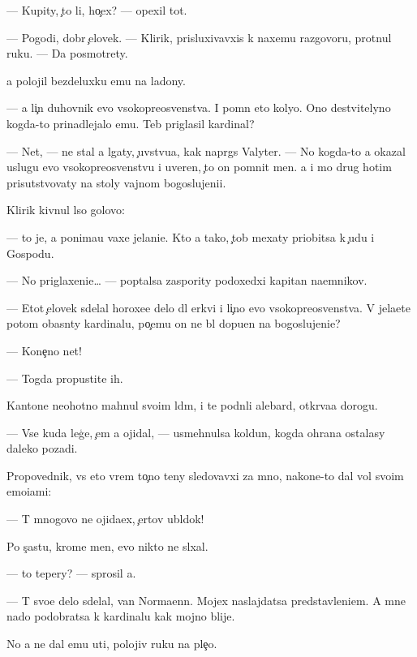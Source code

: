 \documentclass[10pt]{book}
\begin{document}
— Kupity, {\c}to li, ho{\c}ex? — opexil tot.

— Pogodi, dobr{\yi}{\y} {\c}elovek. — Klirik, prisluxivavxi{\y}s{\ia} k naxemu razgovoru, prot{\ia}nul ruku. — Da{\y} posmotrety.

{\Y}a polojil bezdeluxku {\y}emu na ladony.

— {\Y}a li{\c}n{\yi}{\y} duhovnik {\y}evo v{\yi}sokopreosv{\ia}{\x}enstva. I pomn{\iu} eto koly{\q}o. Ono de{\y}stvitelyno kogda-to prinadlejalo {\y}emu. Teb{\ia} priglasil kardinal?

— Net, — ne stal {\y}a lgaty, {\c}uvstvu{\y}a, kak napr{\ia}gs{\ia} Valyter. — No kogda-to {\y}a okazal uslugu {\y}evo v{\yi}sokopreosv{\ia}{\x}enstvu i uveren, {\c}to on pomnit men{\ia}. {\Y}a i mo{\y} drug hotim prisutstvovaty na stoly vajnom bogoslujeni{\y}i.

Klirik kivnul l{\yi}so{\y} golovo{\y}:

— {\C}to je, {\y}a ponima{\y}u vaxe jelani{\y}e. Kto {\y}a tako{\y}, {\c}tob{\yi} mexaty priob{\x}itsa k {\c}udu i Gospodu.

— No priglaxeni{\y}e… — pop{\yi}talsa zaspority podoxedxi{\y} kapitan na{\y}emnikov.

— Etot {\c}elovek sdelal horoxe{\y}e delo dl{\ia} {\Q}erkvi i li{\c}no {\y}evo v{\yi}sokopreosv{\ia}{\x}enstva. V{\yi} jela{\y}ete potom ob{\y}asn{\ia}ty kardinalu, po{\c}emu on ne b{\yi}l dopu{\x}en na bogoslujeni{\y}e?

— Kone{\c}no net!

— Togda propustite ih.

Kantone{\q} neohotno mahnul svo{\y}im l{\iu}d{\ia}m, i te podn{\ia}li alebard{\yi}, otkr{\yi}va{\y}a dorogu.

— Vse kuda leg{\c}e, {\c}em {\y}a ojidal, — usmehnulsa koldun, kogda ohrana ostalasy daleko pozadi.

Propovednik, vs{\e} eto vrem{\ia} to{\c}no teny sledovavxi{\y} za mno{\y}, nakone{\q}-to dal vol{\iu} svo{\y}im emo{\q}i{\y}ami:

— T{\yi} mnogovo ne ojida{\y}ex, {\c}ertov ubl{\iu}dok!

Po s{\c}ast{\y}u, krome men{\ia}, {\y}evo nikto ne sl{\yi}xal.

— {\C}to tepery? — sprosil {\y}a.

— T{\yi} svo{\y}e delo sdelal, van Norma{\y}enn. Mojex naslajdatsa predstavleni{\y}em. A mne nado podobratsa k kardinalu kak mojno blije.

No {\y}a ne dal {\y}emu u{\y}ti, polojiv ruku na ple{\c}o.
\end{document}
